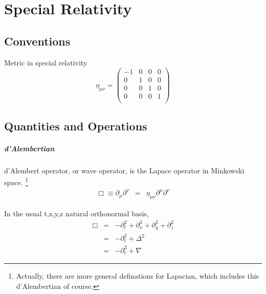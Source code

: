 


\chapter{Special Relativity}





\section{Conventions}

Metric in special relativity
\begin{equation}\eta_{\mu\nu}=\left(\begin{matrix}
	-1 & 0 & 0 & 0\\
	0 & 1 & 0 & 0\\
	0 & 0 & 1 & 0\\
	0 & 0 & 0 & 1\\
\end{matrix}\right)\end{equation}





\section{Quantities and Operations}

\paragraph{d'Alembertian}
d'Alembert operator, or wave operator, is the Lapace operator in Minkowski space.
\footnote{Actually, there are more general definations for Lapacian, which includes this d'Alembertian of course.}
\begin{eqnarray}
\Box\equiv \partial_\mu\partial^\nu&=&\eta_{\mu\nu}\partial^\mu \partial^\nu
\end{eqnarray}

In the usual {t,x,y,z} natural orthonormal basis,
\begin{eqnarray}
 \Box&=&-\partial_t^2+\partial_x^2+\partial_y^2+\partial_z^2 \\
&=&-\partial_t^2+\Delta^2 \\
&=&-\partial_t^2+\nabla
\end{eqnarray}

